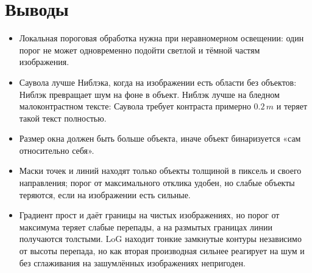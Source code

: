 \documentclass[11pt,a4paper]{article}
\begin{document}
\section{Выводы}
\begin{itemize}[label=--, leftmargin=1.5em, itemsep=0.2em, topsep=0.2em]
  \item Локальная пороговая обработка нужна при неравномерном освещении:
        один порог не может одновременно подойти светлой и тёмной частям
        изображения.
  \item Саувола лучше Ниблэка, когда на изображении есть области без
        объектов: Ниблэк превращает шум на фоне в объект. Ниблэк лучше на
        бледном малоконтрастном тексте: Саувола требует контраста примерно
        $0.2\,m$ и теряет такой текст полностью.
  \item Размер окна должен быть больше объекта, иначе объект
        бинаризуется «сам относительно себя».
  \item Маски точек и линий находят только объекты толщиной в пиксель и
        своего направления; порог от максимального отклика удобен, но
        слабые объекты теряются, если на изображении есть сильные.
  \item Градиент прост и даёт границы на чистых изображениях, но порог от
        максимума теряет слабые перепады, а на размытых границах линии
        получаются толстыми. LoG находит тонкие замкнутые контуры независимо
        от высоты перепада, но как вторая производная сильнее реагирует на
        шум и без сглаживания на зашумлённых изображениях непригоден.
\end{itemize}
\end{document}
